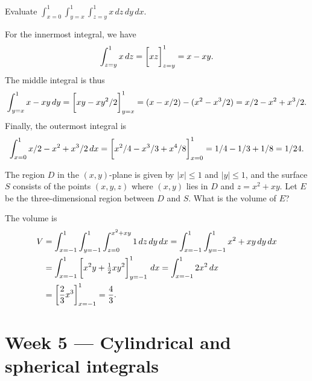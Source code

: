 \documentclass[a4paper]{amsart}
\renewenvironment{solution}{\SolutionInline}{\endSolutionInline}
\begin{document}
\begin{exercise}
 Evaluate $\displaystyle \int_{x=0}^1\int_{y=x}^1\int_{z=y}^1 x\,dz\,dy\,dx$.
\end{exercise}
\begin{solution}
 For the innermost integral, we have
 \[ \int_{z=y}^1 x\,dz = 
     \CH{xz}_{z=y}^1 = x-xy.
 \]
 The middle integral is thus
 \[ \int_{y=x}^1 x-xy\,dy =
     \CH{xy-xy^2/2}_{y=x}^1 = 
      (x-x/2)-(x^2-x^3/2) = x/2 - x^2 + x^3/2.
 \]
 Finally, the outermost integral is
 \[ \int_{x=0}^1 x/2-x^2+x^3/2\,dx = 
     \CH{x^2/4-x^3/3+x^4/8}_{x=0}^1 =
      1/4 - 1/3 + 1/8 = 1/24. 
 \]
\end{solution}

\begin{exercise}
 The region $D$ in the $(x,y)$-plane is given by $|x|\leq 1$ and
 $|y|\leq 1$, and the surface $S$ consists of the points $(x,y,z)$
 where $(x,y)$ lies in $D$ and $z=x^2+xy$.  Let $E$ be the
 three-dimensional region between $D$ and $S$.  What is the volume of
 $E$? 
\end{exercise}
\begin{solution}
 The volume is 
 \begin{align*}
  V &= \int_{x=-1}^1 \int_{y=-1}^1 \int_{z=0}^{x^2+xy} 1\,dz\,dy\,dx 
     = \int_{x=-1}^1 \int_{y=-1}^1 x^2+xy \,dy\,dx \\
    &= \int_{x=-1}^1\CH{x^2y+\half xy^2}_{y=-1}^1\,dx 
     = \int_{x=-1}^1 2x^2\,dx \\
    &= \CH{\frac{2}{3}x^3}_{x=-1}^1 = \frac{4}{3}.
 \end{align*}
\end{solution}

\section*{Week 5 --- Cylindrical and spherical integrals}
\end{document}
